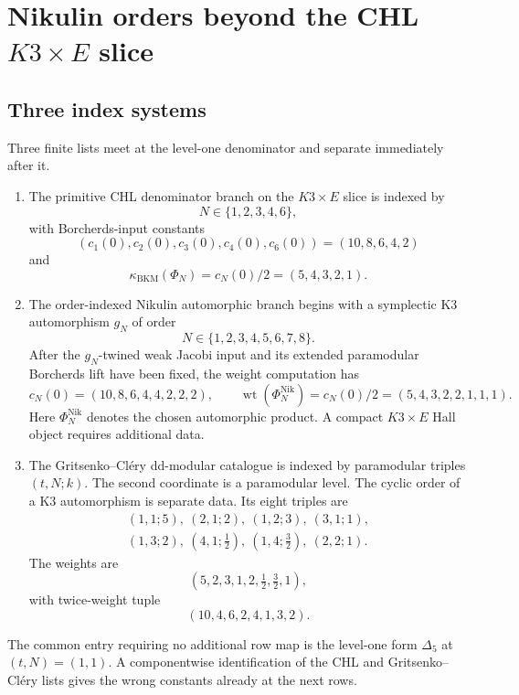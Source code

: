 \providecommand{\kBKM}{\kappa_{\mathrm{BKM}}}
\providecommand{\kch}{\kappa_{\mathrm{ch}}}
\providecommand{\kcat}{\kappa_{\mathrm{cat}}}
\providecommand{\kfib}{\kappa_{\mathrm{fiber}}}
\providecommand{\kHeis}{\kappa_{\mathrm{ch}}^{\mathrm{Heis}}}
\providecommand{\wt}{\operatorname{wt}}
\providecommand{\Dfive}{D_5}
\providecommand{\Phiten}{\Phi_{10}}
\providecommand{\CoHA}{\mathrm{CoHA}}
\providecommand{\bC}{\mathbb{C}}

\section*{Nikulin orders beyond the CHL \texorpdfstring{$K3\times E$}{K3 x E} slice}
\label{sec:nikulin-orders-beyond-chl-k3e}

\subsection*{Three index systems}

Three finite lists meet at the level-one denominator and separate
immediately after it.
\begin{enumerate}[label=\textup{(\roman*)}, leftmargin=1.8em, itemsep=0.4ex]
\item The primitive CHL denominator branch on the $K3\times E$ slice is
indexed by
\[
  N\in\{1,2,3,4,6\},
\]
with Borcherds-input constants
\[
  (c_1(0),c_2(0),c_3(0),c_4(0),c_6(0))
  =
  (10,8,6,4,2)
\]
and
\[
  \kBKM(\Phi_N)=c_N(0)/2=(5,4,3,2,1).
\]
\item The order-indexed Nikulin automorphic branch begins with a
symplectic K3 automorphism $g_N$ of order
\[
  N\in\{1,2,3,4,5,6,7,8\}.
\]
After the $g_N$-twined weak Jacobi input and its extended paramodular
Borcherds lift have been fixed, the weight computation has
\[
  c_N(0)=(10,8,6,4,4,2,2,2),
  \qquad
  \wt(\Phi_N^{\mathrm{Nik}})=c_N(0)/2=(5,4,3,2,2,1,1,1).
\]
Here $\Phi_N^{\mathrm{Nik}}$ denotes the chosen automorphic product. A
compact $K3\times E$ Hall object requires additional data.
\item The Gritsenko--Cl\'ery dd-modular catalogue is indexed by
paramodular triples $(t,N;k)$. The second coordinate is a paramodular
level. The cyclic order of a K3 automorphism is separate data. Its eight triples are
\[
\begin{gathered}
(1,1;5),\ (2,1;2),\ (1,2;3),\ (3,1;1),\\
(1,3;2),\ (4,1;\tfrac12),\ (1,4;\tfrac32),\ (2,2;1).
\end{gathered}
\]
The weights are
\[
  (5,2,3,1,2,\tfrac12,\tfrac32,1),
\]
with twice-weight tuple
\[
  (10,4,6,2,4,1,3,2).
\]
\end{enumerate}
The common entry requiring no additional row map is the level-one form
$\Delta_5$ at $(t,N)=(1,1)$. A componentwise identification of the CHL
and Gritsenko--Cl\'ery lists gives the wrong constants already at the
next rows.

